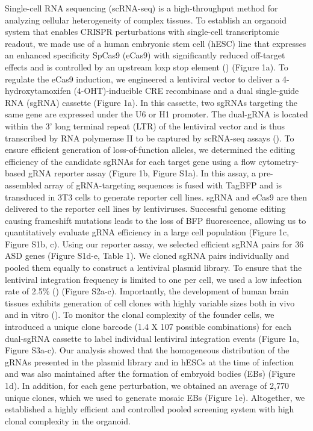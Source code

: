 Single-cell RNA sequencing (scRNA-seq) is a high-throughput method for analyzing cellular heterogeneity of complex tissues. To establish an organoid system that enables CRISPR perturbations with single-cell transcriptomic readout, we made use of a human embryonic stem cell (hESC) line that expresses an enhanced specificity SpCas9 (eCas9) with significantly reduced off-target effects and is controlled by an upstream loxp stop element (\cite{esk_human_2020}) (Figure 1a). To regulate the eCas9 induction, we engineered a lentiviral vector to deliver a 4-hydroxytamoxifen (4-OHT)-inducible CRE recombinase and a dual single-guide RNA (sgRNA) cassette (Figure 1a). In this cassette, two sgRNAs targeting the same gene are expressed under the U6 or H1 promoter. The dual-gRNA is located within the 3' long terminal repeat (LTR) of the lentiviral vector and is thus transcribed by RNA polymerase II to be captured by scRNA-seq assays (\cite{datlinger_pooled_2017}). To ensure efficient generation of loss-of-function alleles, we determined the editing efficiency of the candidate sgRNAs for each target gene using a flow cytometry-based gRNA reporter assay (Figure  1b, Figure S1a). In this assay, a pre-assembled array of gRNA-targeting sequences is fused with TagBFP and is transduced in 3T3 cells to generate reporter cell lines. sgRNA and eCas9 are then delivered to the reporter cell lines by lentiviruses. Successful genome editing causing frameshift mutations leads to the loss of BFP fluorescence, allowing us to quantitatively evaluate gRNA efficiency in a large cell population (Figure  1c, Figure S1b, c). Using our reporter assay, we selected efficient sgRNA pairs for 36 ASD genes (Figure S1d-e, Table 1).  
We cloned sgRNA pairs individually and pooled them equally to construct a lentiviral plasmid library. To ensure that the lentiviral integration frequency is limited to one per cell, we used a low infection rate of 2.5\% (\cite{doench_am_2018}) (Figure S2a-c). Importantly, the development of human brain tissues exhibits generation of cell clones with highly variable sizes both in vivo and in vitro (\cite{esk_human_2020,bizzotto_landmarks_2021}). To monitor the clonal complexity of the founder cells, we introduced a unique clone barcode (1.4 X 107 possible combinations) for each dual-sgRNA cassette to label individual lentiviral integration events (Figure  1a, Figure S3a-c). Our analysis showed that the homogeneous distribution of the gRNAs presented in the plasmid library and in hESCs at the time of infection and was also maintained after the formation of embryoid bodies (EBs) (Figure 1d). In addition, for each gene perturbation, we obtained an average of 2,770 unique clones, which we used to generate mosaic EBs (Figure 1e). Altogether, we established a highly efficient and controlled pooled screening system with high clonal complexity in the organoid. 


